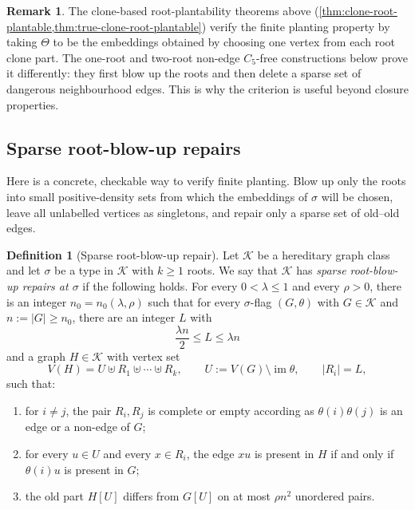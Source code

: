 \documentclass[11pt]{article}
\theoremstyle{definition}
\newtheorem{definition}[definition]{Definition}
\newtheorem{remark}[remark]{Remark}
\newcommand{\K}{\mathcal{K}}
\begin{document}
\begin{remark}
The clone-based root-plantability theorems above
(\cref{thm:clone-root-plantable,thm:true-clone-root-plantable}) verify the finite
planting property by taking $\Theta$ to be the embeddings obtained by choosing one vertex
from each root clone part.  The one-root and two-root non-edge $C_5$-free constructions
below prove it differently: they first blow up the roots and then delete a sparse set of
dangerous neighbourhood edges.  This is why the criterion is useful beyond closure
properties.
\end{remark}

\subsection{Sparse root-blow-up repairs}

Here is a concrete, checkable way to verify finite planting.  Blow up only
the roots into small positive-density sets from which the embeddings of
$\sigma$ will be chosen, leave all unlabelled vertices as singletons, and repair only a
sparse set of old--old edges.

\begin{definition}[Sparse root-blow-up repair]\label{def:sparse-root-repair}
Let $\K$ be a hereditary graph class and let $\sigma$ be a type in $\K$ with
$k\ge1$ roots.  We say that $\K$ has \emph{sparse root-blow-up
repairs at $\sigma$} if the following holds.
For every $0<\lambda\le1$ and every $\rho>0$, there is an integer
$n_0=n_0(\lambda,\rho)$ such that for every $\sigma$-flag $(G,\theta)$ with $G\in\K$
and $n:=|G|\ge n_0$, there are an integer $L$ with
\[
  \frac{\lambda n}{2}\le L\le \lambda n
\]
and a graph $H\in\K$ with vertex set
\[
  V(H)=U\uplus R_1\uplus\cdots\uplus R_k,
  \qquad
  U:=V(G)\setminus\operatorname{im}\theta,
  \qquad
  |R_i|=L,
\]
such that:
\begin{enumerate}[label=\textup{(\roman*)}, leftmargin=2.5em]
  \item for $i\ne j$, the pair $R_i,R_j$ is complete or empty according as
        $\theta(i)\theta(j)$ is an edge or a non-edge of $G$;
  \item for every $u\in U$ and every $x\in R_i$, the edge $xu$ is present in
        $H$ if and only if $\theta(i)u$ is present in $G$;
  \item the old part $H[U]$ differs from $G[U]$ on at most $\rho n^2$ unordered
        pairs.
\end{enumerate}
\end{definition}
\end{document}
